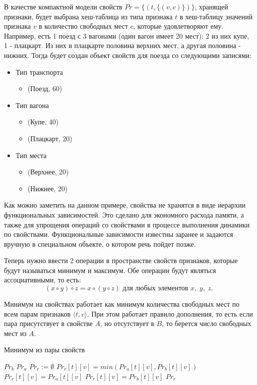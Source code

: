 В качестве компактной модели свойств $Pr=\{(t,\{(v, c)\})\}$, хранящей признаки, будет выбрана хеш-таблица из типа признака $t$ в хеш-таблицу значений признака $v$ в количество свободных мест $c$, которые удовлетворяют ему. Например, есть 1 поезд с 3 вагонами (один вагон имеет 20 мест): 2 из них купе, 1 - плацкарт. Из них в плацкарте половина верхних мест, а другая половина - нижних. Тогда будет создан объект свойств для поезда со следующими записями:
\begin{itemize}
	\item Тип транспорта
	\begin{itemize}
		\item (Поезд, 60)
	\end{itemize}
	\item Тип вагона
	\begin{itemize}
		\item (Купе, 40)
		\item (Плацкарт, 20)
	\end{itemize}
	\item Тип места
	\begin{itemize}
		\item (Верхнее, 20)
		\item (Нижнее, 20)
	\end{itemize}
\end{itemize}

Как можно заметить на данном примере, свойства не хранятся в виде иерархии функциональных зависимостей. Это сделано для экономного расхода памяти, а также для упрощения операций со свойствами в процессе выполнения динамики по свойствами. Функциональные зависимости известны заранее и задаются вручную в специальном объекте, о котором речь пойдет позже.

Теперь нужно ввести 2 операции в пространстве свойств признаков, которые будут называться минимум и максимум. Обе операции будут являться ассоциативными, то есть:
\[
(x\circ y)\circ z=x\circ(y\circ z)\text{ для любых элементов }x,\;y,\;z.
\]

Минимум на свойствах работает как минимум количества свободных мест по всем парам признаков $\langle t, v \rangle$. При этом работает правило дополнения, то есть если пара присутствует в свойстве $A$, но отсутствует в $B$, то берется число свободных мест из $A$.

\begin{algorithm}[!h]
	\caption{Минимум из пары свойств}\label{lst5}
	\begin{algorithmic}
			\State \Return $Pr_b$
		\EndIf
		\State \Return $Pr_a$
		\EndIf
		\State $Pr_r := \emptyset$ 
			\State $Pr_r[t][v] = min(Pr_a[t][v], Pr_b[t][v])$
		\EndFor
			\State $Pr_r[t][v] = Pr_a[t][v]$
		\EndFor
			\State $Pr_r[t][v] = Pr_b[t][v]$
		\EndFor
		\State \Return $Pr_r$
		\EndFunction
	\end{algorithmic}
\end{algorithm}

